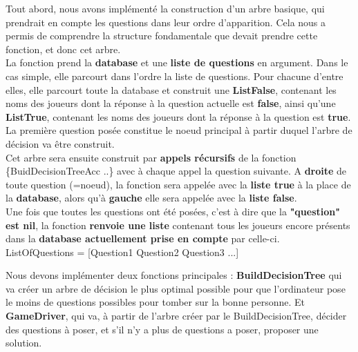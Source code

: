 \documentclass[12pt]{article}
\begin{document}
Tout abord, nous avons implémenté la construction d'un arbre basique, qui prendrait en compte les questions dans leur ordre d'apparition. Cela nous a permis de comprendre la structure fondamentale que devait prendre cette fonction, et donc cet arbre.\\

La fonction prend la \textbf{database} et une \textbf{liste de questions} en argument. Dans le cas simple, elle parcourt dans l'ordre la liste de questions. Pour chacune d'entre elles, elle parcourt toute la database et construit une \textbf{ListFalse}, contenant les noms des joueurs dont la réponse à la question actuelle est \textbf{false}, ainsi qu'une \textbf{ListTrue}, contenant les noms des joueurs dont la réponse à la question est \textbf{true}.\\
La première question posée constitue le noeud principal à partir duquel l'arbre de décision va être construit.\\ Cet arbre sera ensuite construit par \textbf{appels récursifs} de la fonction\\ {\selectfont \{BuidDecisionTreeAcc ..\}} avec à chaque appel la question suivante. A \textbf{droite} de toute question (=noeud), la fonction sera appelée avec la \textbf{liste true} à la place de la \textbf{database}, alors qu'à \textbf{gauche} elle sera appelée avec la \textbf{liste false}.\\

Une fois que toutes les questions ont été posées, c'est à dire que la \textbf{"question" est nil}, la fonction \textbf{renvoie une liste} contenant tous les joueurs encore présents dans la \textbf{database actuellement prise en compte} par celle-ci.\\


ListOfQuestions = [Question1 Question2 Question3 ...]\\


  



Nous devons implémenter deux fonctions principales : \textbf{BuildDecisionTree} qui va créer un arbre de décision le plus optimal possible pour que l'ordinateur pose le moins de questions possibles pour tomber sur la bonne personne. Et \textbf{GameDriver}, qui va, à partir de l'arbre créer par le BuildDecisionTree, décider des questions à poser, et s'il n'y a plus de questions a poser, proposer une solution.
\end{document}
